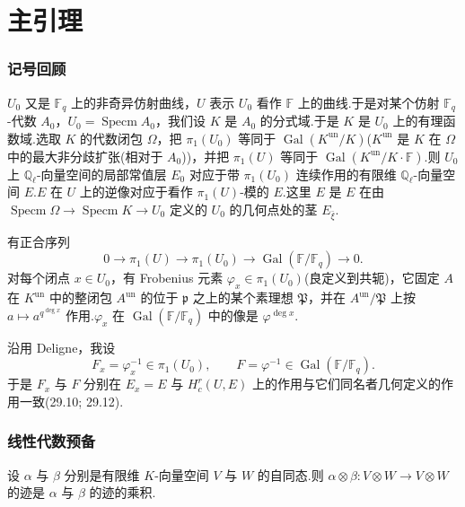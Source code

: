 ﻿%
\chapter{主引理}\label{sec:30}

\subsection*{记号回顾}

$U_0$ 又是 $\mathbb{F}_q$ 上的非奇异仿射曲线，$U$ 表示 $U_0$ 看作 $\mathbb{F}$ 上的曲线.于是对某个仿射 $\mathbb{F}_q$-代数 $A_0$，$U_0 = \operatorname{Specm} A_0$，我们设 $K$ 是 $A_0$ 的分式域.于是 $K$ 是 $U_0$ 上的有理函数域.选取 $K$ 的代数闭包 $\Omega$，把 $\pi_1(U_0)$ 等同于 $\operatorname{Gal}(K^{\mathrm{un}}/K)$($K^{\mathrm{un}}$ 是 $K$ 在 $\Omega$ 中的最大非分歧扩张(相对于 $A_0$))，并把 $\pi_1(U)$ 等同于 $\operatorname{Gal}(K^{\mathrm{un}}/K \cdot \mathbb{F})$.则 $U_0$ 上 $\mathbb{Q}_{\ell}$-向量空间的局部常值层 $E_0$ 对应于带 $\pi_1(U_0)$ 连续作用的有限维 $\mathbb{Q}_{\ell}$-向量空间 $E$.$E$ 在 $U$ 上的逆像对应于看作 $\pi_1(U)$-模的 $E$.这里 $E$ 是 $E$ 在由 $\operatorname{Specm} \Omega \to \operatorname{Specm} K \to U_0$ 定义的 $U_0$ 的几何点处的茎 $E_{\bar{\xi}}$.

有正合序列
\[
0 \to \pi_1(U) \to \pi_1(U_0) \to \operatorname{Gal}(\mathbb{F}/\mathbb{F}_q) \to 0.
\]
对每个闭点 $x \in U_0$，有 Frobenius 元素 $\varphi_x \in \pi_1(U_0)$(良定义到共轭)，它固定 $A$ 在 $K^{\mathrm{un}}$ 中的整闭包 $A^{\mathrm{un}}$ 的位于 $\mathfrak{p}$ 之上的某个素理想 $\mathfrak{P}$，并在 $A^{\mathrm{un}}/\mathfrak{P}$ 上按 $a \mapsto a^{q^{\deg x}}$ 作用.$\varphi_x$ 在 $\operatorname{Gal}(\mathbb{F}/\mathbb{F}_q)$ 中的像是 $\varphi^{\deg x}$.

沿用 Deligne，我设
\[
F_x = \varphi^{-1}_x \in \pi_1(U_0), \qquad F = \varphi^{-1} \in \operatorname{Gal}(\mathbb{F}/\mathbb{F}_q).
\]
于是 $F_x$ 与 $F$ 分别在 $E_x = E$ 与 $H^{r}_{c}(U, E)$ 上的作用与它们同名者几何定义的作用一致(29.10; 29.12).

\subsection*{线性代数预备}

\begin{lemma}\label{lem:30.1}
设 $\alpha$ 与 $\beta$ 分别是有限维 $K$-向量空间 $V$ 与 $W$ 的自同态.则 $\alpha \otimes \beta \colon V \otimes W \to V \otimes W$ 的迹是 $\alpha$ 与 $\beta$ 的迹的乘积.
\end{lemma}

